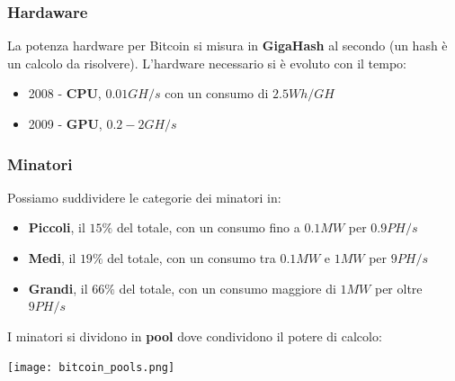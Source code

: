 \subsubsection{Hardaware}
La potenza hardware per Bitcoin si misura in \textbf{GigaHash} al secondo (un hash è un calcolo da risolvere). L'hardware necessario si è evoluto con il tempo:
\begin{itemize}
	\item 2008 - \textbf{CPU}, $0.01GH/s$ con un consumo di $2.5Wh/GH$
	\item 2009 - \textbf{GPU}, $0.2-2GH/s$
\end{itemize}

\subsubsection{Minatori}
Possiamo suddividere le categorie dei minatori in:
\begin{itemize}
	\item \textbf{Piccoli}, il $15\%$ del totale, con un consumo fino a $0.1MW$ per $0.9PH/s$
	\item \textbf{Medi}, il $19\%$ del totale, con un consumo tra $0.1MW$ e $1MW$ per $9PH/s$
	\item \textbf{Grandi}, il $66\%$ del totale, con un consumo maggiore di $1MW$ per oltre $9PH/s$
\end{itemize}
I minatori si dividono in \textbf{pool} dove condividono il potere di calcolo:
\begin{center}
	\texttt{[image: bitcoin\_pools.png]}
\end{center}

